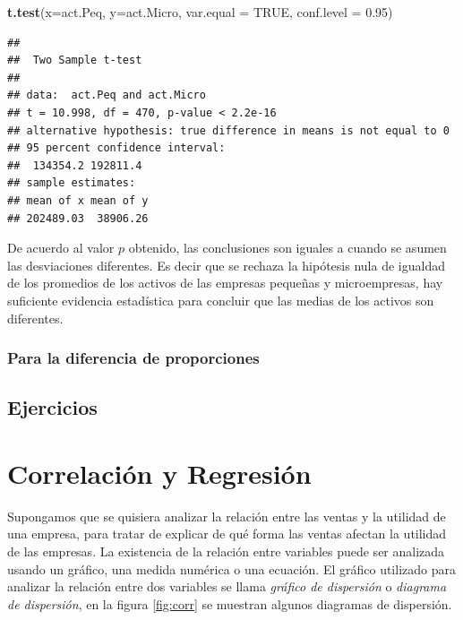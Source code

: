 \documentclass[letterpaper,]{book}
\newenvironment{Shaded}{\begin{snugshade}}{\end{snugshade}}
\newcommand{\DataTypeTok}[1]{\textcolor[rgb]{0.13,0.29,0.53}{#1}}
\newcommand{\FloatTok}[1]{\textcolor[rgb]{0.00,0.00,0.81}{#1}}
\newcommand{\KeywordTok}[1]{\textcolor[rgb]{0.13,0.29,0.53}{\textbf{#1}}}
\newcommand{\NormalTok}[1]{#1}
\newcommand{\OtherTok}[1]{\textcolor[rgb]{0.56,0.35,0.01}{#1}}
\begin{document}
\begin{Shaded}
\begin{Highlighting}[]
\KeywordTok{t.test}\NormalTok{(}\DataTypeTok{x=}\NormalTok{act.Peq, }\DataTypeTok{y=}\NormalTok{act.Micro, }\DataTypeTok{var.equal =} \OtherTok{TRUE}\NormalTok{,}
       \DataTypeTok{conf.level =} \FloatTok{0.95}\NormalTok{)}
\end{Highlighting}
\end{Shaded}

\begin{verbatim}
## 
##  Two Sample t-test
## 
## data:  act.Peq and act.Micro
## t = 10.998, df = 470, p-value < 2.2e-16
## alternative hypothesis: true difference in means is not equal to 0
## 95 percent confidence interval:
##  134354.2 192811.4
## sample estimates:
## mean of x mean of y 
## 202489.03  38906.26
\end{verbatim}

De acuerdo al valor \(p\) obtenido, las conclusiones son iguales a cuando se asumen las desviaciones diferentes. Es decir que se rechaza la hipótesis nula de igualdad de los promedios de los activos de las empresas pequeñas y microempresas, hay suficiente evidencia estadística para concluir que las medias de los activos son diferentes.

\hypertarget{para-la-diferencia-de-proporciones}{%
\subsection{Para la diferencia de proporciones}\label{para-la-diferencia-de-proporciones}}

\newpage

\hypertarget{ejercicios-1}{%
\section{Ejercicios}\label{ejercicios-1}}

\hypertarget{methods}{%
\chapter{Correlación y Regresión}\label{methods}}

Supongamos que se quisiera analizar la relación entre las ventas y la utilidad de una empresa, para tratar de explicar de qué forma las ventas afectan la utilidad de las empresas. La existencia de la relación entre variables puede ser analizada usando un gráfico, una medida numérica o una ecuación.
El gráfico utilizado para analizar la relación entre dos variables se llama \emph{gráfico de dispersión} o \emph{diagrama de dispersión}, en la figura \ref{fig:corr} se muestran algunos diagramas de dispersión.
\end{document}
